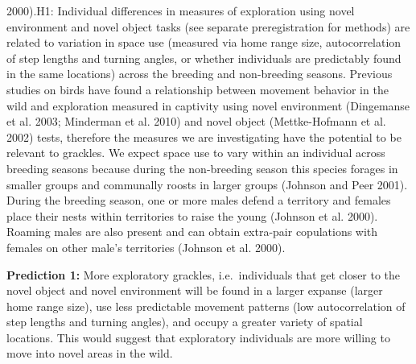 \documentclass[
]{article}
\begin{document}
{{{2000).}{H1: Individual differences in measures of exploration using novel environment and novel object tasks (see separate preregistration for methods) are related to variation in space use (measured via home range size, autocorrelation of step lengths and turning angles, or whether individuals are predictably found in the same locations) across the breeding and non-breeding seasons. Previous studies on birds have found a relationship between movement behavior in the wild and exploration measured in captivity using novel environment (Dingemanse et al. 2003; Minderman et al. 2010) and novel object (Mettke-Hofmann et al. 2002) tests, therefore the measures we are investigating have the potential to be relevant to grackles. We expect space use to vary within an individual across breeding seasons because during the non-breeding season this species forages in smaller groups and communally roosts in larger groups (Johnson and Peer 2001). During the breeding season, one or more males defend a territory and females place their nests within territories to raise the young (Johnson et al. 2000). Roaming males are also present and can obtain extra-pair copulations with females on other male's territories (Johnson et al. 2000).}}\label{h1-individual-differences-in-measures-of-exploration-using-novel-environment-and-novel-object-tasks-see-separate-preregistration-for-methods-are-related-to-variation-in-space-use-measured-via-home-range-size-autocorrelation-of-step-lengths-and-turning-angles-or-whether-individuals-are-predictably-found-in-the-same-locations-across-the-breeding-and-non-breeding-seasons.-previous-studies-on-birds-have-found-a-relationship-between-movement-behavior-in-the-wild-and-exploration-measured-in-captivity-using-novel-environment-minderman2010novel-dingemanse2003natal-and-novel-object-mettke2002significance-tests-therefore-the-measures-we-are-investigating-have-the-potential-to-be-relevant-to-grackles.-we-expect-space-use-to-vary-within-an-individual-across-breeding-seasons-because-during-the-non-breeding-season-this-species-forages-in-smaller-groups-and-communally-roosts-in-larger-groups-johnson2001great.-during-the-breeding-season-one-or-more-males-defend-a-territory-and-females-place-their-nests-within-territories-to-raise-the-young-johnson2000male.-roaming-males-are-also-present-and-can-obtain-extra-pair-copulations-with-females-on-other-males-territories-johnson2000male.}}

\textbf{Prediction 1:} More exploratory grackles, i.e.~individuals that
get closer to the novel object and novel environment will be found in a
larger expanse (larger home range size), use less predictable movement
patterns (low autocorrelation of step lengths and turning angles), and
occupy a greater variety of spatial locations. This would suggest that
exploratory individuals are more willing to move into novel areas in the
wild.
\end{document}
